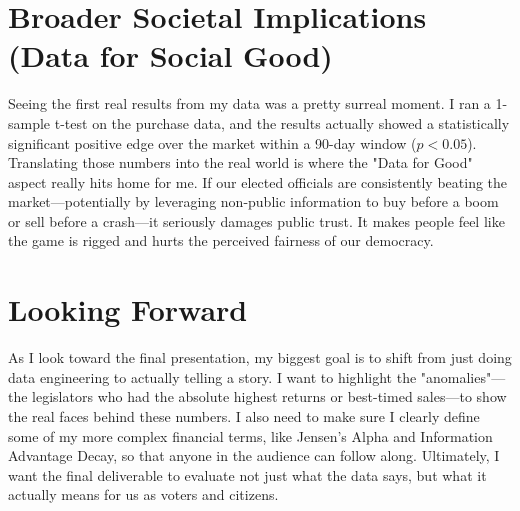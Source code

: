 \documentclass[12pt]{article}
\begin{document}
\section*{Broader Societal Implications (Data for Social Good)}
Seeing the first real results from my data was a pretty surreal moment. I ran a 1-sample t-test on the purchase data, and the results actually showed a statistically significant positive edge over the market within a 90-day window ($p < 0.05$). Translating those numbers into the real world is where the "Data for Good" aspect really hits home for me. If our elected officials are consistently beating the market—potentially by leveraging non-public information to buy before a boom or sell before a crash—it seriously damages public trust. It makes people feel like the game is rigged and hurts the perceived fairness of our democracy.

\section*{Looking Forward}
As I look toward the final presentation, my biggest goal is to shift from just doing data engineering to actually telling a story. I want to highlight the "anomalies"—the legislators who had the absolute highest returns or best-timed sales—to show the real faces behind these numbers. I also need to make sure I clearly define some of my more complex financial terms, like Jensen's Alpha and Information Advantage Decay, so that anyone in the audience can follow along. Ultimately, I want the final deliverable to evaluate not just what the data says, but what it actually means for us as voters and citizens.
\end{document}
